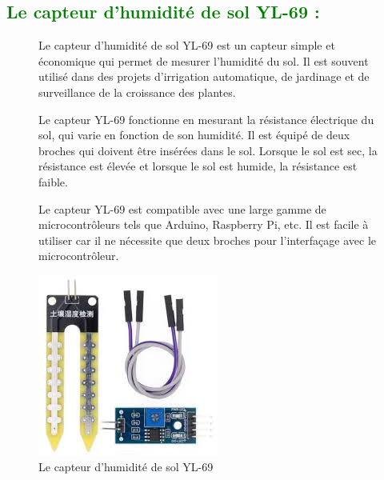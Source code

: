 \begin{flushleft}
	\subsection{\textcolor{green}{Le capteur d’humidité de sol YL-69 :}}
		\begin{figure}[h]
			\begin{minipage}{0.6\textwidth}
				Le capteur d'humidité de sol YL-69 est un capteur simple et économique qui permet de mesurer l'humidité du sol. Il est souvent utilisé dans des projets d'irrigation automatique, de jardinage et de surveillance de la croissance des plantes.
				
				Le capteur YL-69 fonctionne en mesurant la résistance électrique du sol, qui varie en fonction de son humidité. Il est équipé de deux broches qui doivent être insérées dans le sol. Lorsque le sol est sec, la résistance est élevée et lorsque le sol est humide, la résistance est faible.
				
				Le capteur YL-69 est compatible avec une large gamme de microcontrôleurs tels que Arduino, Raspberry Pi, etc. Il est facile à utiliser car il ne nécessite que deux broches pour l'interfaçage avec le microcontrôleur.
			\end{minipage}
			\begin{minipage}{0.4\textwidth}
				\centering
				\includegraphics[width=\textwidth]{chapitres/images/siol-sensor.jpg}
				\caption{Le capteur d’humidité de sol YL-69}
				\label{fig:votre_image}
			\end{minipage}
		\end{figure}
	\newpage

\end{flushleft}
